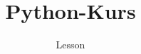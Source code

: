 \documentclass[]{tudbeamer}
\title{Python-Kurs}
\subtitle{Lesson}
\begin{document}
\maketitle

\begin{frame}
\tableofcontents
\end{frame}

\end{document}
